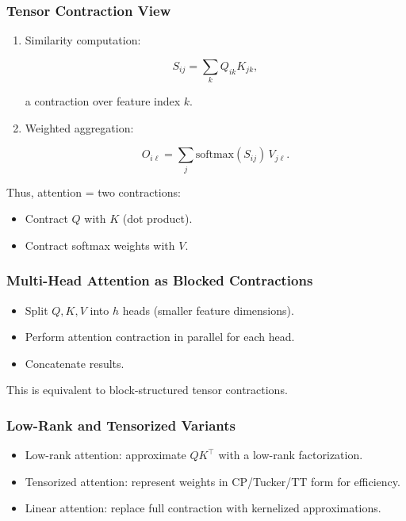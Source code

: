 \documentclass[
  letterpaper,
  DIV=11,
  numbers=noendperiod]{scrreprt}
\providecommand{\tightlist}{%
  \setlength{\itemsep}{0pt}\setlength{\parskip}{0pt}}
\begin{document}
\subsubsection{Tensor Contraction View}\label{tensor-contraction-view}

\begin{enumerate}
\def\labelenumi{\arabic{enumi}.}
\item
  Similarity computation:

  \[
  S_{ij} = \sum_{k} Q_{ik} K_{jk},
  \]

  a contraction over feature index \(k\).
\item
  Weighted aggregation:

  \[
  O_{i\ell} = \sum_{j} \text{softmax}(S_{ij}) \, V_{j\ell}.
  \]
\end{enumerate}

Thus, attention = two contractions:

\begin{itemize}
\tightlist
\item
  Contract \(Q\) with \(K\) (dot product).
\item
  Contract softmax weights with \(V\).
\end{itemize}

\subsubsection{Multi-Head Attention as Blocked
Contractions}\label{multi-head-attention-as-blocked-contractions}

\begin{itemize}
\tightlist
\item
  Split \(Q, K, V\) into \(h\) heads (smaller feature dimensions).
\item
  Perform attention contraction in parallel for each head.
\item
  Concatenate results.
\end{itemize}

This is equivalent to block-structured tensor contractions.

\subsubsection{Low-Rank and Tensorized
Variants}\label{low-rank-and-tensorized-variants}

\begin{itemize}
\tightlist
\item
  Low-rank attention: approximate \(QK^\top\) with a low-rank
  factorization.
\item
  Tensorized attention: represent weights in CP/Tucker/TT form for
  efficiency.
\item
  Linear attention: replace full contraction with kernelized
  approximations.
\end{itemize}
\end{document}
